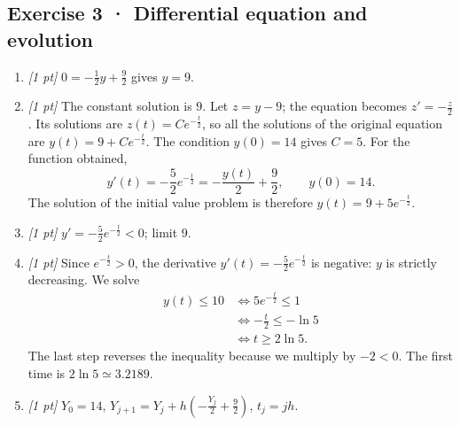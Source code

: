 \subsection*{Exercise 3 · Differential equation and evolution}\begin{enumerate}

\item \textit{[1 pt]} $0=-\frac{1}{2}y+\frac{9}{2}$ gives $y=9$.

\item \textit{[1 pt]} The constant solution is $9$. Let $z=y-9$; the equation becomes $z'=-\frac{z}{2}$. Its solutions are $z(t)=Ce^{-\frac{t}{2}}$, so all the solutions of the original equation are $y(t)=9+Ce^{-\frac{t}{2}}$.
The condition $y(0)=14$ gives $C=5$. For the function obtained,
\[y'(t)=-\frac{5}{2}e^{-\frac{t}{2}}=-\frac{y(t)}{2}+\frac{9}{2},\qquad y(0)=14.\]
The solution of the initial value problem is therefore $y(t)=9+5e^{-\frac{t}{2}}$.

\item \textit{[1 pt]} $y'=-\frac{5}{2}e^{-\frac{t}{2}}<0$; limit $9$.

\item \textit{[1 pt]} Since $e^{-\frac{t}{2}}>0$, the derivative $y'(t)=-\frac{5}{2}e^{-\frac{t}{2}}$ is negative: $y$ is strictly decreasing. We solve
\[\begin{aligned}y(t)\le 10&\Longleftrightarrow 5e^{-\frac{t}{2}}\le1\\&\Longleftrightarrow -\frac{t}{2}\le-\ln 5\\&\Longleftrightarrow t\ge 2\ln 5.\end{aligned}\]
The last step reverses the inequality because we multiply by $-2<0$. The first time is $2\ln 5\simeq\num{3,2189}$.

\item \textit{[1 pt]} $Y_0=14$, $Y_{j+1}=Y_j+h(-\frac{Y_j}{2}+\frac{9}{2})$, $t_j=jh$.

\end{enumerate}

